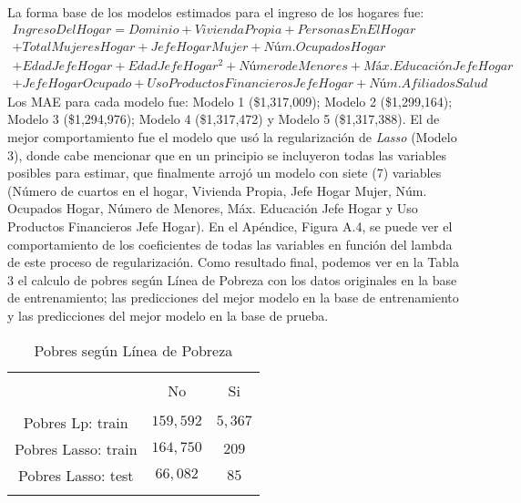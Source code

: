\documentclass[11pt]{article}
\begin{document}
La forma base de los modelos estimados para el ingreso de los hogares fue:
\begin{equation} \begin{split}
IngresoDelHogar = Dominio + ViviendaPropia + PersonasEnElHogar\\
+ Total Mujeres Hogar + Jefe Hogar Mujer + Núm. Ocupados Hogar \\
+Edad Jefe Hogar+ Edad Jefe Hogar^2 + Número de Menores + Máx. Educación Jefe Hogar\\
+ Jefe Hogar Ocupado + Uso Productos Financieros Jefe Hogar + Núm. Afiliados Salud
\label{eqn:kfold} \end{split} \end{equation}
 \justify
Los MAE para cada modelo fue: Modelo 1 (\$1,317,009); Modelo 2 (\$1,299,164); Modelo 3 (\$1,294,976); Modelo 4 (\$1,317,472) y Modelo 5 (\$1,317,388).
 \justify
 El de mejor comportamiento fue el modelo que usó la regularización de \emph{Lasso} (Modelo 3), donde cabe mencionar que en un principio se incluyeron todas las variables posibles para estimar, que finalmente arrojó un modelo con siete (7) variables (Número de cuartos en el hogar, Vivienda Propia, Jefe Hogar Mujer, Núm. Ocupados Hogar, Número de Menores, Máx. Educación Jefe Hogar y Uso Productos Financieros Jefe Hogar). En el Apéndice, Figura A.4, se puede ver el comportamiento de los coeficientes de todas las variables en función del lambda de este proceso de regularización.
 \justify
 Como resultado final, podemos ver en la Tabla 3 el calculo de pobres según Línea de Pobreza con los datos originales en la base de entrenamiento; las predicciones del mejor modelo en la base de entrenamiento y las predicciones del mejor modelo en la base de prueba. 
  \clearpage
\begin{table}[!htbp] \centering 
  \caption{Pobres según Línea de Pobreza} 
  \label{} 
\begin{tabular}{@{\extracolsep{5pt}} ccc} 
\\[-1.8ex]\hline 
\hline \\[-1.8ex] 
 & No & Si \\ 
\hline \\[-1.8ex] 
Pobres Lp: train & $159,592$ & $5,367$ \\ 
Pobres Lasso: train & $164,750$ & $209$ \\ 
Pobres Lasso: test & $66,082$ & $85$ \\ 
\hline \\[-1.8ex] 
\end{tabular} 
\end{table}
\end{document}
